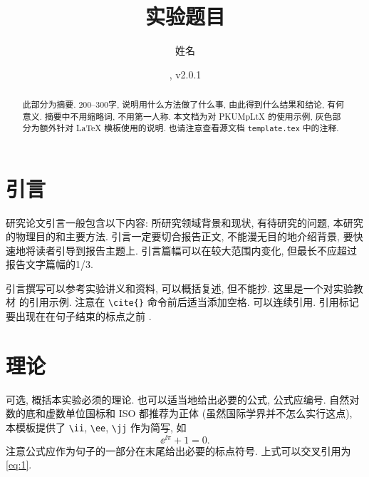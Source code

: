 \documentclass[notofandol]{mpltx}
\newcommand{\note}[1]{{\color{gray}#1}}
\begin{document}
\title{实验题目} %
\author{姓名} %
\date{, v2.0.1}
\begin{abstract}
    此部分为摘要.
    200--300字, 说明用什么方法做了什么事, 由此得到什么结果和结论, 有何意义.
    摘要中不用缩略词, 不用第一人称.
    \note{本文档为对 \textsf{PKUMpLtX} 的使用示例, 灰色部分为额外针对 \LaTeX{} 模板使用的说明.
        也请注意查看源文档 \texttt{template.tex} 中的注释.}
\end{abstract}

\maketitle

\section{引言}

研究论文引言一般包含以下内容:
所研究领域背景和现状,
有待研究的问题,
本研究的物理目的和主要方法.
引言一定要切合报告正文, 不能漫无目的地介绍背景, 要快速地将读者引导到报告主题上.
引言篇幅可以在较大范围内变化, 但最长不应超过报告文字篇幅的1/3.

引言撰写可以参考实验讲义和资料, 可以概括复述, 但不能抄.
\note{这里是一个对实验教材 \cite{jindaishiyan} 的引用示例.}
\note{注意在 \texttt{\textbackslash{}cite\{\}} 命令前后适当添加空格.
    可以连续引用.
    引用标记要出现在在句子结束的标点之前 \cite{jindaishiyan,zamojski2007deep}.}

\section{理论}\label{sec:theory}

可选, 概括本实验必须的理论.
也可以适当地给出必要的公式, 公式应编号.
\note{自然对数的底和虚数单位国标和 ISO 都推荐为正体 (虽然国际学界并不怎么实行这点), 本模板提供了 \texttt{\textbackslash{}ii}, \texttt{\textbackslash{}ee}, \texttt{\textbackslash{}jj} 作为简写, 如
    \begin{equation}\label{eq:1}
        \ee^{\ii\pi}+1=0.
    \end{equation}
    注意公式应作为句子的一部分在末尾给出必要的标点符号.
    上式可以交叉引用为\autoref{eq:1}.}
\end{document}
